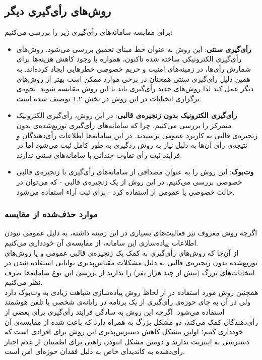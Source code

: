 \subsection{روش‌های رأی‌گیری دیگر}
برای مقایسه سامانه‌های رأی‌گیری زیر را بررسی می‌کنیم:
\begin{itemize}
	\item 
	\textbf{رأی‌گیری سنتی}:
	این روش به عنوان خط مبنای تحقیق بررسی می‌شود. روش‌های رأی‌گیری الکترونیکی ساخته شده تاکنون، همواره با وجود کاهش هزینه‌ها برای شمارش رأی‌ها، در زمینه‌های امنیت و حریم خصوصی خطرهایی ایجاد کرده‌اند. به همین دلیل رأی‌گیری سنتی همچنان در برخی موارد ممکن است بهتر از روش‌های دیگر عمل کند لذا روش‌های جدید رأی‌گیری باید با این روش مقایسه شوند. نحوه‌ی برگزاری انختابات در این روش در بخش ۱.۲ توصیف شده است. 
	\item \textbf{رأی‌‌گیری الکترونیک بدون زنجیره‌ی قالبی}:
	در این روش، رأی‌گیری الکترونیک متمرکز را بررسی می‌کنیم، چرا که سامانه‌های رأی‌گیری توزیع‌شده‌ی بدون زنجیره‌ی قالبی به کاربرد عمومی نرسیدند. در این سامانه‌ها اطلاعات رأی‌دهندگان و نتیجه‌ی رأی آن‌ها به دلیل نیاز به روش ردگیری به طور کامل ثبت می‌شود اما در فرایند ثبت رأی تفاوت چندانی با سامانه‌های سنتی ندارند.
 	\item \textbf{وت‌بوک}:
 	این روش را به عنوان مصداقی از سامانه‌های رأی‌گیری با زنجیره‌ی قالبی خصوصی بررسی می‌کنیم. 
 	در این روش از یک‌ زنجیره‌ی قالبی - که می‌توان در حالت خصوصی یا عمومی از استفاده کرد - برای ثبت آراء استفاده می‌شود. 
\end{itemize}
\subsubsection{موارد حذف‌شده از مقایسه}
 	 اگرچه روش‌ معروف  نیز فعالیت‌های بسیاری در این زمینه داشته، به دلیل عمومی نبودن اطلاعات پیاده‌سازی این سامانه‌، از مقایسه‌ی آن خود‌داری می‌کنیم. 
 	 \\
 	 از آن‌جا که روش‌های رأی‌گیری به کمک یک زنجیره‌ی قالبی عمومی و یا روش‌های توزیع‌شده بدون زنجیره‌ی قالبی به دلیل مشکلات مقیاس‌پذیری توانایی استفاده شدن در انتخابات‌های بزرگ (بیش از چند هزار نفر) را ندارند از بررسی این نوع سامانه‌ها صرف نظر می‌کنیم.
 	 \\
 	 همچنین روش مورد استفاده در  از لحاظ روش پیاده‌سازی شباهت زیادی به وت‌بوک دارد ولی در آن به جای حوزه‌ی رأی‌گیری از یک برنامه در رایانه‌ی شخصی یا تلفن هوشمند استفاده می‌شود. اگرچه این روش به سادگی فرایند رأی‌گیری برای بعضی از رأی‌دهندگان کمک می‌کند، دو مشکل بزرگ به همراه دارد که باعث شده از مقایسه‌ی آن خودداری کنیم؛ اولین مشکل کاهش دسترس‌پذیری این روش برای افرادی است که دسترسی به اینترنت ندارند و دومین مشکل انبودن راهیی برای اطمینان از عدم اجبار رأی‌دهنده به کاندیدای خاص به دلیل فقدان حوزه‌ای امن است.
